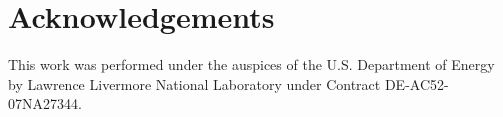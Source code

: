 \section*{Acknowledgements}

This work was performed under the auspices
of the U.S. Department of Energy by Lawrence Livermore National
Laboratory under Contract DE-AC52-07NA27344.
